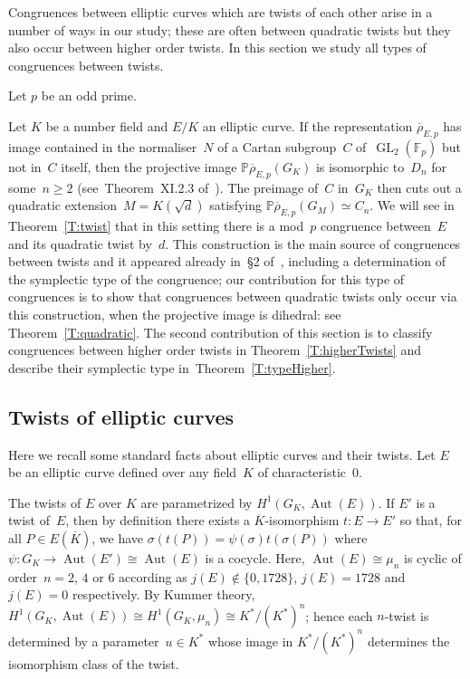 \documentclass[twoside,leqno,symbols-for-thanks, draft]{rmi}
\numberwithin{equation}{section}
\newcommand{\Fp}{\mathbb{F}_p}
\newcommand{\PP}{\mathbb{P}}
\newcommand{\Kbar}{{\overline{K}}}
\newcommand{\rhobar}{{\overline{\rho}}}
\DeclareMathOperator{\Aut}{Aut}
\newcommand{\GL}{\operatorname{GL}}
\theoremstyle{remark}
\begin{document}
Congruences between elliptic curves which are twists of each other
arise in a number of ways in our study; these are often between
quadratic twists but they also occur between higher order twists. In
this section we study all types of congruences between twists.

Let $p$ be an odd prime.

Let $K$ be a number field and $E/K$ an elliptic curve. If the
representation $\rhobar_{E,p}$ has image contained in the
normaliser~$N$ of a Cartan subgroup~$C$ of~$\GL_2(\Fp)$ but not
in~$C$ itself, then the projective image $\PP \rhobar_{E,p}(G_K)$ is
isomorphic to~$D_{n}$ for some~$n \geq 2$
(see~Theorem~XI.2.3 of~\cite{LangModForms}). The preimage of~$C$
in~$G_K$ then cuts out a quadratic extension~$M = K(\sqrt{d})$
satisfying $\PP \rhobar_{E,p}(G_M) \simeq C_n$.  We will see in
Theorem~\ref{T:twist} that in this setting there is a mod~$p$
congruence between~$E$ and its quadratic twist by~$d$. This
construction is the main source of congruences between twists and it
appeared already in~\S2 of~\cite{Halberstadt-11nonsplit}, including a
determination of the symplectic type of the congruence; our
contribution for this type of congruences is to show that congruences
between quadratic twists only occur via this construction, when the
projective image is dihedral: see Theorem~\ref{T:quadratic}. The
second contribution of this section is to classify congruences between
higher order twists in Theorem~\ref{T:higherTwists} and describe
their symplectic type in~Theorem~\ref{T:typeHigher}.

\subsection{Twists of elliptic curves}
\label{S:twists}
Here we recall some standard facts about elliptic curves and their twists.
Let $E$ be an elliptic curve defined over any field~$K$ of
characteristic~$0$.

The twists of $E$ over $K$ are parametrized by $H^1(G_K,\Aut(E))$.  If
$E'$ is a twist of~$E$, then by definition there exists a $\Kbar$-isomorphism
$t:E\to E'$ so that, for all $P\in E(\Kbar)$, we have 
$\sigma(t(P))=\psi(\sigma)t(\sigma(P))$ 
where~$\psi:G_K\to\Aut(E')\cong\Aut(E)$ is a cocycle.  Here,
$\Aut(E)\cong\mu_n$ is cyclic of order~$n=2$, $4$ or $6$ according as
$j(E)\not\in\{0,1728\}$, $j(E)=1728$ and $j(E)=0$ respectively.  By
Kummer theory, $H^1(G_K,\Aut(E))\cong H^1(G_K,\mu_n)\cong
K^*/(K^*)^n$; hence each $n$-twist is determined by a parameter~$u\in
K^*$ whose image in $K^*/(K^*)^n$ determines the isomorphism class of
the twist. 
\end{document}
